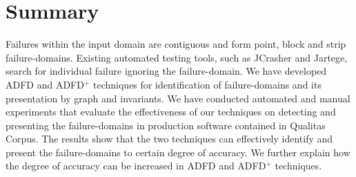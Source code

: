 \section{Summary} \label{sec:conclusion}
Failures within the input domain are contiguous and form point, block and strip failure-domains. Existing automated testing tools, such as JCrasher and Jartege, search for individual failure ignoring the failure-domain. We have developed ADFD and ADFD$^+$ techniques for identification of failure-domains and its presentation by graph and invariants. We have conducted automated and manual experiments that evaluate the effectiveness of our techniques on detecting and presenting the failure-domains in production software contained in Qualitas Corpus. The results show that the two techniques can effectively identify and present the failure-domains to certain degree of accuracy. We further explain how the degree of accuracy can be increased in ADFD and ADFD$^+$ techniques.  
\smallskip


